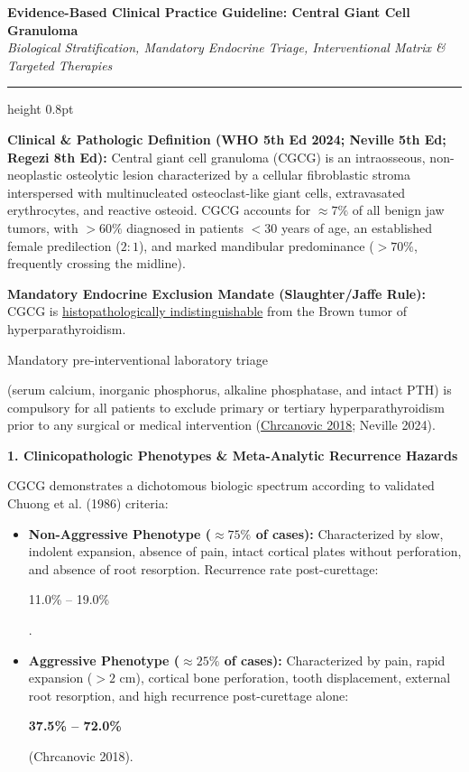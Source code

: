 \documentclass[9pt,a4paper]{article}
\newcommand{\hlg}[1]{\colorbox{hlgray}{\strut #1}}
\newcommand{\hly}[1]{\colorbox{hlyellow}{\strut #1}}
\newcommand{\hlr}[1]{\colorbox{hlred}{\strut\color{darkred}#1}}
\begin{document}

\begin{center}
{\Large\bfseries Evidence-Based Clinical Practice Guideline: Central Giant Cell Granuloma}\\[2pt]
{\small\itshape Biological Stratification, Mandatory Endocrine Triage, Interventional Matrix \& Targeted Therapies}
\end{center}
\vspace{-4pt}
\hrule height 0.8pt
\vspace{4pt}

\textbf{Clinical \& Pathologic Definition (WHO 5th Ed 2024; Neville 5th Ed; Regezi 8th Ed):}
Central giant cell granuloma (CGCG) is an intraosseous, non-neoplastic osteolytic lesion characterized by a cellular fibroblastic stroma interspersed with multinucleated osteoclast-like giant cells, extravasated erythrocytes, and reactive osteoid. CGCG accounts for $\approx 7\%$ of all benign jaw tumors, with $>60\%$ diagnosed in patients $<30$ years of age, an established female predilection ($2:1$), and marked mandibular predominance ($>70\%$, frequently crossing the midline).

\textbf{Mandatory Endocrine Exclusion Mandate (Slaughter/Jaffe Rule):}
CGCG is \underline{histopathologically indistinguishable} from the Brown tumor of hyperparathyroidism. \hly{Mandatory pre-interventional laboratory triage} (serum calcium, inorganic phosphorus, alkaline phosphatase, and intact PTH) is compulsory for all patients to exclude primary or tertiary hyperparathyroidism prior to any surgical or medical intervention (\href{https://pubmed.ncbi.nlm.nih.gov/29751369/}{Chrcanovic 2018}; Neville 2024).

\vspace{2pt}
{\large\bfseries 1. Clinicopathologic Phenotypes \& Meta-Analytic Recurrence Hazards}
\vspace{1pt}

CGCG demonstrates a dichotomous biologic spectrum according to validated Chuong et al. (1986) criteria:
\begin{itemize}
    \item \textbf{Non-Aggressive Phenotype ($\approx 75\%$ of cases):} Characterized by slow, indolent expansion, absence of pain, intact cortical plates without perforation, and absence of root resorption. Recurrence rate post-curettage: \hlg{11.0\% -- 19.0\%}.
    \item \textbf{Aggressive Phenotype ($\approx 25\%$ of cases):} Characterized by pain, rapid expansion ($>2\text{ cm}$), cortical bone perforation, tooth displacement, external root resorption, and high recurrence post-curettage alone: \hlr{\textbf{37.5\% -- 72.0\%}} (Chrcanovic 2018).
\end{itemize}
\end{document}
